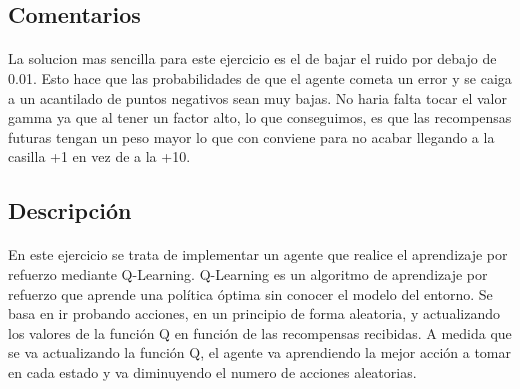 \documentclass{report}
\begin{document}
      \subsection*{Comentarios}
        \paragraph*{}{
          La solucion mas sencilla para este ejercicio es el de bajar el ruido por debajo de 0.01.
          Esto hace que las probabilidades de que el agente cometa un error y se caiga a un acantilado de puntos negativos sean muy bajas.
          No haria falta tocar el valor gamma ya que al tener un factor alto, lo que conseguimos, es que las recompensas futuras tengan un peso mayor lo que con conviene para no acabar llegando a la casilla +1 en vez de a la +10.
        }
      \subsection*{Descripción}
        \paragraph*{}
        {
          En este ejercicio se trata de implementar un agente que realice el aprendizaje por refuerzo mediante Q-Learning.
          Q-Learning es un algoritmo de aprendizaje por refuerzo que aprende una política óptima sin conocer el modelo del entorno.
          Se basa en ir probando acciones, en un principio de forma aleatoria, y actualizando los valores de la función Q en función de las recompensas recibidas.
          A medida que se va actualizando la función Q, el agente va aprendiendo la mejor acción a tomar en cada estado y va diminuyendo el numero de acciones aleatorias.
        }
\end{document}
